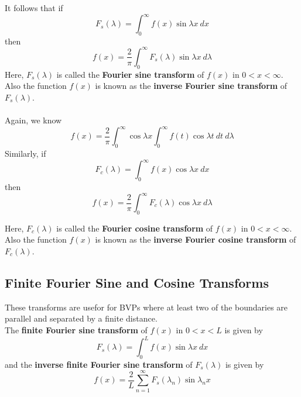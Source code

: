 \documentclass[12pt]{article}
\numberwithin{equation}{subsection}
\begin{document}
It follows that if
\begin{equation}
    \boxed{ F_s(\lambda) = \int_{0}^{\infty} { f(x) \sin{\lambda x} } \: d{x} }
\end{equation}
then
\begin{equation}
    \boxed{ f(x) = \frac{2}{\pi} \int_{0}^{\infty} { F_s(\lambda) \sin{\lambda x} } \: d{\lambda} }
\end{equation}
Here, $F_s(\lambda)$ is called the \textbf{Fourier sine transform} of $f(x)$ in $0<x<\infty$. Also the function $f(x)$ is known as the \textbf{inverse Fourier sine transform} of $F_s(\lambda)$.\\~\\

Again, we know
\begin{equation}
    f(x) = \frac{2}{\pi} \int_{0}^{\infty} { \cos{\lambda x} \int_{0}^{\infty} { f(t) \cos{\lambda t} } \: d{t} } \: d{\lambda}
\end{equation}
Similarly, if
\begin{equation}
    \boxed{ F_c(\lambda) = \int_{0}^{\infty} { f(x) \cos{\lambda x} } \: d{x} }
\end{equation}
then
\begin{equation}
    \boxed{ f(x) = \frac{2}{\pi} \int_{0}^{\infty} { F_c(\lambda) \cos{\lambda x} } \: d{\lambda} }
\end{equation}

Here, $F_c(\lambda)$ is called the \textbf{Fourier cosine transform} of $f(x)$ in $0<x<\infty$. Also the function $f(x)$ is known as the \textbf{inverse Fourier cosine transform} of $F_c(\lambda)$.

\subsection{Finite Fourier Sine and Cosine Transforms}
These transforms are usefor for BVPs where at least two of the boundaries are parallel and separated by a finite distance.\\

The \textbf{finite Fourier sine transform} of $f(x)$ in $0<x<L$ is given by
\begin{equation}
    \boxed{ F_s(\lambda) = \int_{0}^{L} { f(x) \sin{\lambda x} } \: d{x} }
\end{equation}
and the \textbf{inverse finite Fourier sine transform} of $F_s(\lambda)$ is given by
\begin{equation}
    \boxed{ f(x) = \frac{2}{L} \sum_{n=1}^{\infty} { F_s(\lambda_n) \sin{\lambda_n x} } }
\end{equation}
\end{document}
